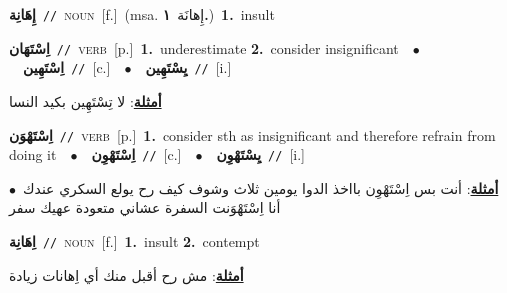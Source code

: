 \documentclass[10pt,a4paper,twoside]{article} %
\begin{document}
\begin{multicols}{2}
{\setlength\topsep{0pt}\textbf{\foreignlanguage{arabic}{إِهَانِة}}\ {\color{gray}\texttt{//}\color{black}}\ \textsc{noun}\ [f.]\ \color{gray}(msa. \foreignlanguage{arabic}{إِهانَة}~\foreignlanguage{arabic}{\textbf{١.}})\color{black}\ \textbf{1.}~insult\ } \vspace{2mm}

{\setlength\topsep{0pt}\textbf{\foreignlanguage{arabic}{اِسْتَهَان}}\ {\color{gray}\texttt{//}\color{black}}\ \textsc{verb}\ [p.]\ \textbf{1.}~underestimate  \textbf{2.}~consider insignificant\ \ $\bullet$\ \ \setlength\topsep{0pt}\textbf{\foreignlanguage{arabic}{اِسْتَهِين}}\ {\color{gray}\texttt{//}\color{black}}\ [c.]\ \ $\bullet$\ \ \setlength\topsep{0pt}\textbf{\foreignlanguage{arabic}{يِسْتَهِين}}\ {\color{gray}\texttt{//}\color{black}}\ [i.]\  \begin{flushright}\color{gray}\foreignlanguage{arabic}{\textbf{\underline{\foreignlanguage{arabic}{أمثلة}}}: لا تِسْتَهِين بكيد النسا}\end{flushright}\color{black}} \vspace{2mm}

{\setlength\topsep{0pt}\textbf{\foreignlanguage{arabic}{اِسْتَهْوَن}}\ {\color{gray}\texttt{//}\color{black}}\ \textsc{verb}\ [p.]\ \textbf{1.}~consider sth as insignificant and therefore refrain from doing it\ \ $\bullet$\ \ \setlength\topsep{0pt}\textbf{\foreignlanguage{arabic}{اِسْتَهْوِن}}\ {\color{gray}\texttt{//}\color{black}}\ [c.]\ \ $\bullet$\ \ \setlength\topsep{0pt}\textbf{\foreignlanguage{arabic}{يِسْتَهْوِن}}\ {\color{gray}\texttt{//}\color{black}}\ [i.]\  \begin{flushright}\color{gray}\foreignlanguage{arabic}{\textbf{\underline{\foreignlanguage{arabic}{أمثلة}}}: أنت بس اِسْتَهْوِن بااخذ الدوا يومين ثلاث وشوف كيف رح يولع السكري عندك\ $\bullet$\ \  أنا اِسْتَهْوَنت السفرة عشاني متعودة عهيك سفر}\end{flushright}\color{black}} \vspace{2mm}

{\setlength\topsep{0pt}\textbf{\foreignlanguage{arabic}{اِهَانِة}}\ {\color{gray}\texttt{//}\color{black}}\ \textsc{noun}\ [f.]\ \textbf{1.}~insult  \textbf{2.}~contempt\  \begin{flushright}\color{gray}\foreignlanguage{arabic}{\textbf{\underline{\foreignlanguage{arabic}{أمثلة}}}: مش رح أقبل منك أي اِهانات زيادة}\end{flushright}\color{black}} \vspace{2mm}


\end{multicols}
\end{document}
